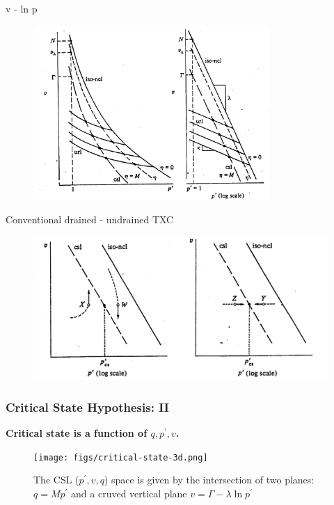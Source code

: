 \documentclass[notes]{beamer}
\begin{document}
\begin{frame}{v - ln p}
	\begin{figure}
		\includegraphics[width=0.8\textwidth]{figs/v-p_v-lnp.png}
	\end{figure}
\end{frame}

\begin{frame}{Conventional drained - undrained TXC}
	\begin{figure}
		\includegraphics[width=\textwidth]{figs/drained-undrained-csl.png}
	\end{figure}
\end{frame}

\begin{frame}
\frametitle{Critical State Hypothesis: II}
\textbf{Critical state is a function of $q, p^\prime, v$. }
\begin{figure}
	\texttt{[image: figs/critical-state-3d.png]}
	\caption*{The CSL ($p^\prime, v, q$) space is given by the intersection of two planes: $q = Mp^\prime$ and a cruved vertical plane $v = \Gamma - \lambda \ln p^\prime$}
\end{figure}
\end{frame}
\end{document}
